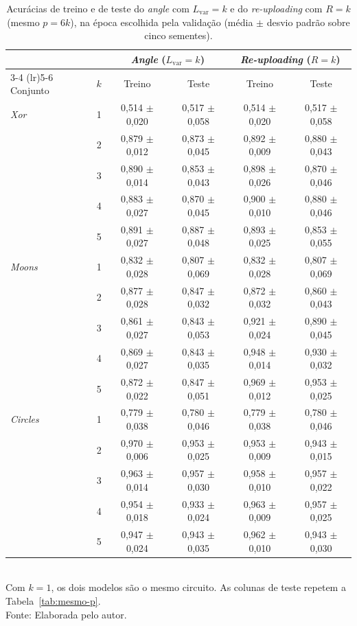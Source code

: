 \begin{table}[htb]
\centering
\footnotesize
\setlength{\tabcolsep}{4pt}
\caption[Acurácias de treino e de teste por profundidade]{Acurácias de treino e de teste do \textit{angle} com $L_\text{var} = k$ e do \textit{re-uploading} com $R = k$ (mesmo $p = 6k$), na época escolhida pela validação (média $\pm$ desvio padrão sobre cinco sementes).}
\label{tab:treino-teste-profundidade}
\begin{tabular}{lccccc}
\toprule
 & & \multicolumn{2}{c}{\textit{Angle} ($L_\text{var} = k$)} & \multicolumn{2}{c}{\textit{Re-uploading} ($R = k$)} \\
\cmidrule(lr){3-4} \cmidrule(lr){5-6}
Conjunto & $k$ & Treino & Teste & Treino & Teste \\
\midrule
\textit{Xor} & 1 & 0,514 $\pm$ 0,020 & 0,517 $\pm$ 0,058 & 0,514 $\pm$ 0,020 & 0,517 $\pm$ 0,058 \\
 & 2 & 0,879 $\pm$ 0,012 & 0,873 $\pm$ 0,045 & 0,892 $\pm$ 0,009 & 0,880 $\pm$ 0,043 \\
 & 3 & 0,890 $\pm$ 0,014 & 0,853 $\pm$ 0,043 & 0,898 $\pm$ 0,026 & 0,870 $\pm$ 0,046 \\
 & 4 & 0,883 $\pm$ 0,027 & 0,870 $\pm$ 0,045 & 0,900 $\pm$ 0,010 & 0,880 $\pm$ 0,046 \\
 & 5 & 0,891 $\pm$ 0,027 & 0,887 $\pm$ 0,048 & 0,893 $\pm$ 0,025 & 0,853 $\pm$ 0,055 \\
\midrule
\textit{Moons} & 1 & 0,832 $\pm$ 0,028 & 0,807 $\pm$ 0,069 & 0,832 $\pm$ 0,028 & 0,807 $\pm$ 0,069 \\
 & 2 & 0,877 $\pm$ 0,028 & 0,847 $\pm$ 0,032 & 0,872 $\pm$ 0,032 & 0,860 $\pm$ 0,043 \\
 & 3 & 0,861 $\pm$ 0,027 & 0,843 $\pm$ 0,053 & 0,921 $\pm$ 0,024 & 0,890 $\pm$ 0,045 \\
 & 4 & 0,869 $\pm$ 0,027 & 0,843 $\pm$ 0,035 & 0,948 $\pm$ 0,014 & 0,930 $\pm$ 0,032 \\
 & 5 & 0,872 $\pm$ 0,022 & 0,847 $\pm$ 0,051 & 0,969 $\pm$ 0,012 & 0,953 $\pm$ 0,025 \\
\midrule
\textit{Circles} & 1 & 0,779 $\pm$ 0,038 & 0,780 $\pm$ 0,046 & 0,779 $\pm$ 0,038 & 0,780 $\pm$ 0,046 \\
 & 2 & 0,970 $\pm$ 0,006 & 0,953 $\pm$ 0,025 & 0,953 $\pm$ 0,009 & 0,943 $\pm$ 0,015 \\
 & 3 & 0,963 $\pm$ 0,014 & 0,957 $\pm$ 0,030 & 0,958 $\pm$ 0,010 & 0,957 $\pm$ 0,022 \\
 & 4 & 0,954 $\pm$ 0,018 & 0,933 $\pm$ 0,024 & 0,963 $\pm$ 0,009 & 0,957 $\pm$ 0,025 \\
 & 5 & 0,947 $\pm$ 0,024 & 0,943 $\pm$ 0,035 & 0,962 $\pm$ 0,010 & 0,943 $\pm$ 0,030 \\
\bottomrule
\end{tabular}
\\[2pt]
{\footnotesize Com $k = 1$, os dois modelos são o mesmo circuito. As colunas de teste repetem a Tabela~\ref{tab:mesmo-p}.}
\\[2pt]
{\footnotesize Fonte: Elaborada pelo autor.}
\end{table}
